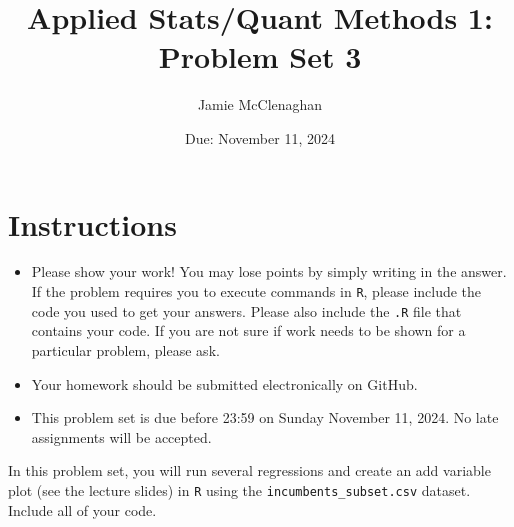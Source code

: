 \documentclass[12pt,letterpaper]{article}
\title{Applied Stats/Quant Methods 1: Problem Set 3}
\date{Due: November 11, 2024}
\author{Jamie McClenaghan}
\begin{document}
	\maketitle
	\section*{Instructions}
	\begin{itemize}
		\item Please show your work! You may lose points by simply writing in the answer. If the problem requires you to execute commands in \texttt{R}, please include the code you used to get your answers. Please also include the \texttt{.R} file that contains your code. If you are not sure if work needs to be shown for a particular problem, please ask.
	\item Your homework should be submitted electronically on GitHub.
	\item This problem set is due before 23:59 on Sunday November 11, 2024. No late assignments will be accepted.

	\end{itemize}

		\vspace{.25cm}
	
\noindent In this problem set, you will run several regressions and create an add variable plot (see the lecture slides) in \texttt{R} using the \texttt{incumbents\_subset.csv} dataset. Include all of your code.

	\vspace{15cm}
\end{document}
